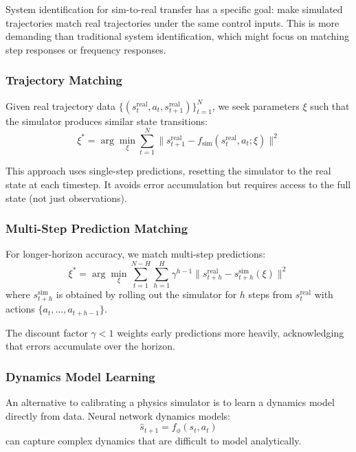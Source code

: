 System identification for sim-to-real transfer has a specific goal: make simulated trajectories match real trajectories under the same control inputs. This is more demanding than traditional system identification, which might focus on matching step responses or frequency responses.

\subsubsection{Trajectory Matching}

Given real trajectory data $\{(s_t^{\text{real}}, a_t, s_{t+1}^{\text{real}})\}_{t=1}^{N}$, we seek parameters $\xi$ such that the simulator produces similar state transitions:
\begin{equation}
\xi^* = \arg\min_\xi \sum_{t=1}^{N} \| s_{t+1}^{\text{real}} - f_{\text{sim}}(s_t^{\text{real}}, a_t; \xi) \|^2
\label{eq:trajectory_matching}
\end{equation}

This approach uses single-step predictions, resetting the simulator to the real state at each timestep. It avoids error accumulation but requires access to the full state (not just observations).

\subsubsection{Multi-Step Prediction Matching}

For longer-horizon accuracy, we match multi-step predictions:
\begin{equation}
\xi^* = \arg\min_\xi \sum_{t=1}^{N-H} \sum_{h=1}^{H} \gamma^{h-1} \| s_{t+h}^{\text{real}} - s_{t+h}^{\text{sim}}(\xi) \|^2
\end{equation}
where $s_{t+h}^{\text{sim}}$ is obtained by rolling out the simulator for $h$ steps from $s_t^{\text{real}}$ with actions $\{a_t, \ldots, a_{t+h-1}\}$.

The discount factor $\gamma < 1$ weights early predictions more heavily, acknowledging that errors accumulate over the horizon.

\subsubsection{Dynamics Model Learning}

An alternative to calibrating a physics simulator is to learn a dynamics model directly from data. Neural network dynamics models:
\begin{equation}
\hat{s}_{t+1} = f_\phi(s_t, a_t)
\end{equation}
can capture complex dynamics that are difficult to model analytically.

